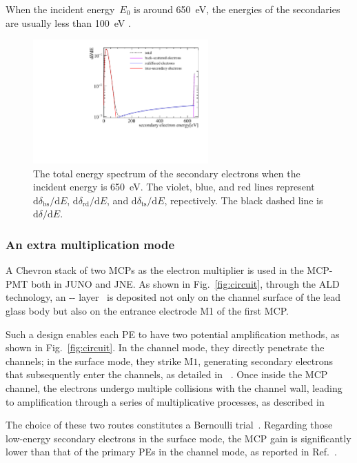 When the incident energy~$E_0$ is around \SI{650}{eV}, the energies of the secondaries are usually less than \SI{100}{eV} .
\begin{figure}[htbp]
	\centering
	\includegraphics[width=0.6\textwidth]{PMTRelated/GTmodel/SES.pdf}
	\caption{The total energy spectrum of the secondary electrons when the incident energy is \SI{650}{eV}.
		The violet, blue, and red lines represent $\mathrm{d}\delta_{\mathrm{bs}}/\mathrm{d}E$, $\mathrm{d}\delta_{\mathrm{rd}}/\mathrm{d}E$, and
		$\mathrm{d}\delta_{\mathrm{ts}}/\mathrm{d}E$, repectively.
		The black dashed line is $\mathrm{d}\delta/\mathrm{d}E$.}
	\label{fig:SES}
\end{figure}

\subsubsection{An extra multiplication mode}
A Chevron stack of two MCPs as the electron multiplier is used in the MCP-PMT both in JUNO and JNE.
As shown in Fig.~\ref{fig:circuit}, through the ALD technology, an -- layer~\cite{zzj2021Al} is deposited not only on the channel surface of the lead glass body
but also on the entrance electrode M1 of the first MCP.

Such a design enables each PE to have two potential amplification methods, as shown in Fig.~\ref{fig:circuit}.
In the channel mode, they directly penetrate the channels; in the surface mode, they strike $\mathrm{M}1$, generating secondary electrons that subsequently enter the channels, as detailed in ~\cite{2016Optimization}. Once inside the MCP channel, the electrons undergo multiple collisions with the channel wall, leading to amplification through a series of multiplicative processes, as described in~\cite{1955Scintillation}

The choice of these two routes constitutes a Bernoulli trial~\cite{1955Scintillation}. Regarding those low-energy secondary electrons in the surface mode, the MCP gain is significantly lower than that of the primary PEs in the channel mode, as reported in Ref.~\cite{2012An}.

